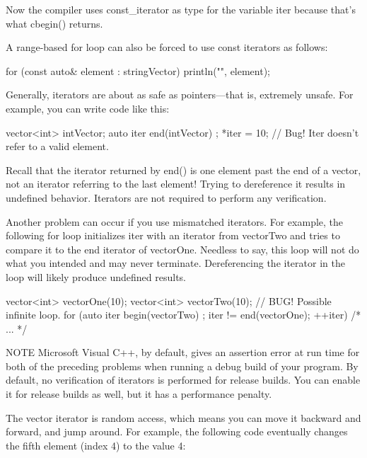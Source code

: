 Now the compiler uses const\_iterator as type for the variable iter because that’s what cbegin() returns.

A range-based for loop can also be forced to use const iterators as follows:

\begin{cpp}
for (const auto& element : stringVector) {
    println("{}", element);
}
\end{cpp}


Generally, iterators are about as safe as pointers—that is, extremely unsafe. For example, you can write code like this:

\begin{cpp}
vector<int> intVector;
auto iter { end(intVector) };
*iter = 10; // Bug! Iter doesn't refer to a valid element.
\end{cpp}

Recall that the iterator returned by end() is one element past the end of a vector, not an iterator referring to the last element! Trying to dereference it results in undefined behavior. Iterators are not required to perform any verification.

Another problem can occur if you use mismatched iterators. For example, the following for loop initializes iter with an iterator from vectorTwo and tries to compare it to the end iterator of vectorOne. Needless to say, this loop will not do what you intended and may never terminate. Dereferencing the iterator in the loop will likely produce undefined results.

\begin{cpp}
vector<int> vectorOne(10);
vector<int> vectorTwo(10);
// BUG! Possible infinite loop.
for (auto iter { begin(vectorTwo) }; iter != end(vectorOne); ++iter) { /* ... */ }
\end{cpp}

\begin{myNotic}{NOTE}
Microsoft Visual C++, by default, gives an assertion error at run time for both of the preceding problems when running a debug build of your program. By default, no verification of iterators is performed for release builds. You can enable it for release builds as well, but it has a performance penalty.
\end{myNotic}


The vector iterator is random access, which means you can move it backward and forward, and jump around. For example, the following code eventually changes the fifth element (index 4) to the value 4:

